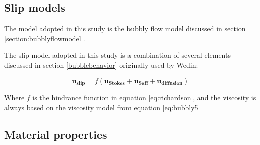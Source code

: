 \subsection{Slip models}

The model adopted in this study is the bubbly flow model discussed in section \ref{section:bubblyflowmodel}.








The slip model adopted in this study is a combination of several elements discussed in section \ref{bubblebehavior} originally used by Wedin\cite{Wedin2001}:

\begin{equation}\label{eq:slipmodel}
    \mathbf{u_{slip}} = f(\mathbf{u_{Stokes}}+\mathbf{u_{Saff}}+\mathbf{u_{diffusion}})
\end{equation}

Where $f$ is the hindrance function in equation \ref{eq:richardson}, and the viscosity is always based on the viscosity model from equation \ref{eq:bubbly5}


\subsection{Material properties}

